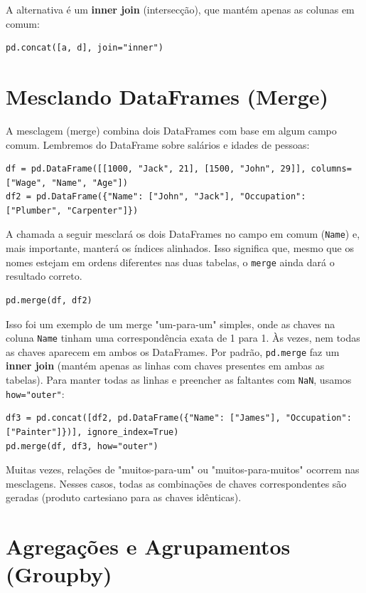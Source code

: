 \documentclass[11pt,a4paper]{article}
\begin{document}
A alternativa é um \textbf{inner join} (intersecção), que mantém apenas as colunas em comum:
\begin{lstlisting}
pd.concat([a, d], join="inner")
\end{lstlisting}

\section{Mesclando DataFrames (Merge)}

A mesclagem (merge) combina dois DataFrames com base em algum campo comum.
Lembremos do DataFrame sobre salários e idades de pessoas:

\begin{lstlisting}
df = pd.DataFrame([[1000, "Jack", 21], [1500, "John", 29]], columns=["Wage", "Name", "Age"])
df2 = pd.DataFrame({"Name": ["John", "Jack"], "Occupation": ["Plumber", "Carpenter"]})
\end{lstlisting}

A chamada a seguir mesclará os dois DataFrames no campo em comum (\texttt{Name}) e, mais importante, manterá os índices alinhados. Isso significa que, mesmo que os nomes estejam em ordens diferentes nas duas tabelas, o \texttt{merge} ainda dará o resultado correto.

\begin{lstlisting}
pd.merge(df, df2)
\end{lstlisting}

Isso foi um exemplo de um merge "um-para-um" simples, onde as chaves na coluna \texttt{Name} tinham uma correspondência exata de 1 para 1. Às vezes, nem todas as chaves aparecem em ambos os DataFrames. Por padrão, \texttt{pd.merge} faz um \textbf{inner join} (mantém apenas as linhas com chaves presentes em ambas as tabelas). Para manter todas as linhas e preencher as faltantes com \texttt{NaN}, usamos \texttt{how="outer"}:

\begin{lstlisting}
df3 = pd.concat([df2, pd.DataFrame({"Name": ["James"], "Occupation": ["Painter"]})], ignore_index=True)
pd.merge(df, df3, how="outer")
\end{lstlisting}

Muitas vezes, relações de "muitos-para-um" ou "muitos-para-muitos" ocorrem nas mesclagens. Nesses casos, todas as combinações de chaves correspondentes são geradas (produto cartesiano para as chaves idênticas).

\section{Agregações e Agrupamentos (Groupby)}
\end{document}
